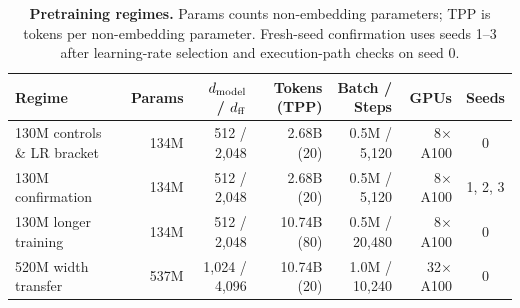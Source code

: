 \begin{table}[tbp]\centering\small
\setlength{\tabcolsep}{5.8pt}
\caption{\textbf{Pretraining regimes.} Params counts non-embedding parameters; TPP is tokens per non-embedding parameter. Fresh-seed confirmation uses seeds 1--3 after learning-rate selection and execution-path checks on seed 0.}\label{tab:regimes}
\begin{tabularx}{\textwidth}{@{}>{\raggedright\arraybackslash}Xrrrrrc@{}}
\toprule
Regime & Params & $d_{\mathrm{model}}$ / $d_{\mathrm{ff}}$ & Tokens (TPP) & Batch / Steps & GPUs & Seeds \\
\midrule
130M controls \& LR bracket & 134M & 512 / 2,048 & 2.68B (20) & 0.5M / 5,120 & 8$\times$A100 & 0 \\
130M confirmation & 134M & 512 / 2,048 & 2.68B (20) & 0.5M / 5,120 & 8$\times$A100 & 1, 2, 3 \\
130M longer training & 134M & 512 / 2,048 & 10.74B (80) & 0.5M / 20,480 & 8$\times$A100 & 0 \\
520M width transfer & 537M & 1,024 / 4,096 & 10.74B (20) & 1.0M / 10,240 & 32$\times$A100 & 0 \\
\bottomrule\end{tabularx}
\end{table}
